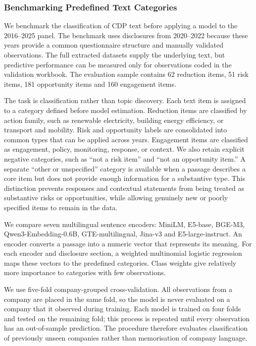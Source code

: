 \subsubsection{Benchmarking Predefined Text Categories}
\label{sec:cdp_text_classification}

We benchmark the classification of CDP text before applying a model to the 2016--2025 panel. The benchmark uses disclosures from 2020--2022 because these years provide a common questionnaire structure and manually validated observations. The full extracted datasets supply the underlying text, but predictive performance can be measured only for observations coded in the validation workbook. The evaluation sample contains 62 reduction items, 51 risk items, 181 opportunity items and 160 engagement items.

The task is classification rather than topic discovery. Each text item is assigned to a category defined before model estimation. Reduction items are classified by action family, such as renewable electricity, building energy efficiency, or transport and mobility. Risk and opportunity labels are consolidated into common types that can be applied across years. Engagement items are classified as engagement, policy, monitoring, response, or context. We also retain explicit negative categories, such as ``not a risk item'' and ``not an opportunity item.'' A separate ``other or unspecified'' category is available when a passage describes a core item but does not provide enough information for a substantive type. This distinction prevents responses and contextual statements from being treated as substantive risks or opportunities, while allowing genuinely new or poorly specified items to remain in the data.

We compare seven multilingual sentence encoders: MiniLM, E5-base, BGE-M3, Qwen3-Embedding-0.6B, GTE-multilingual, Jina-v3 and E5-large-instruct. An encoder converts a passage into a numeric vector that represents its meaning. For each encoder and disclosure section, a weighted multinomial logistic regression maps these vectors to the predefined categories. Class weights give relatively more importance to categories with few observations.

We use five-fold company-grouped cross-validation. All observations from a company are placed in the same fold, so the model is never evaluated on a company that it observed during training. Each model is trained on four folds and tested on the remaining fold; this process is repeated until every observation has an out-of-sample prediction. The procedure therefore evaluates classification of previously unseen companies rather than memorisation of company language.

